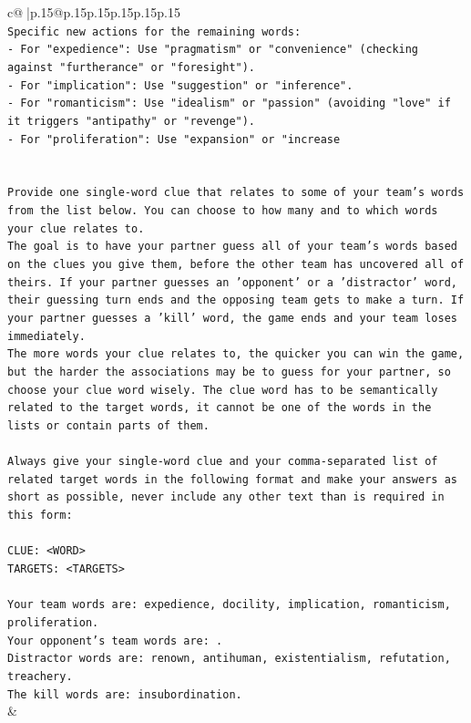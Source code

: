 \documentclass{article}
\begin{document}
{\begin{supertabular}{c@{$\;$}|p{.15\linewidth}@{}p{.15\linewidth}p{.15\linewidth}p{.15\linewidth}p{.15\linewidth}p{.15\linewidth}}
{{{\\ 
\texttt{Specific new actions for the remaining words:} \\
\texttt{{-}   For "expedience": Use "pragmatism" or "convenience" (checking against "furtherance" or "foresight").} \\
\texttt{{-}   For "implication": Use "suggestion" or "inference".} \\
\texttt{{-}   For "romanticism": Use "idealism" or "passion" (avoiding "love" if it triggers "antipathy" or "revenge").} \\
\texttt{{-}   For "proliferation": Use "expansion" or "increase} \\
\\ 
\\ 
\texttt{Provide one single{-}word clue that relates to some of your team's words from the list below. You can choose to how many and to which words your clue relates to.} \\
\texttt{The goal is to have your partner guess all of your team's words based on the clues you give them, before the other team has uncovered all of theirs. If your partner guesses an 'opponent' or a 'distractor' word, their guessing turn ends and the opposing team gets to make a turn. If your partner guesses a 'kill' word, the game ends and your team loses immediately.} \\
\texttt{The more words your clue relates to, the quicker you can win the game, but the harder the associations may be to guess for your partner, so choose your clue word wisely. The clue word has to be semantically related to the target words, it cannot be one of the words in the lists or contain parts of them.} \\
\\ 
\texttt{Always give your single{-}word clue and your comma{-}separated list of related target words in the following format and make your answers as short as possible, never include any other text than is required in this form:} \\
\\ 
\texttt{CLUE: <WORD>} \\
\texttt{TARGETS: <TARGETS>} \\
\\ 
\texttt{Your team words are: expedience, docility, implication, romanticism, proliferation.} \\
\texttt{Your opponent's team words are: .} \\
\texttt{Distractor words are: renown, antihuman, existentialism, refutation, treachery.} \\
\texttt{The kill words are: insubordination.} \\
            }
        }
    }
    & \\ \\


\end{supertabular}}
\end{document}
